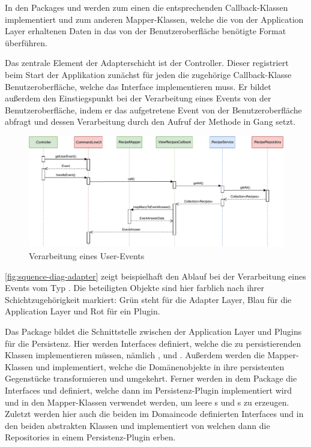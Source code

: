 In den Packages  und  werden zum einen die entsprechenden Callback-Klassen implementiert und zum anderen Mapper-Klassen, welche die von der Application Layer erhaltenen Daten in das von der Benutzeroberfläche benötigte Format überführen.

Das zentrale Element der Adapterschicht ist der Controller. Dieser registriert beim Start der Applikation zunächst für jeden  die zugehörige Callback-Klasse Benutzeroberfläche, welche das Interface  implementieren muss. Er bildet außerdem den Einstiegspunkt bei der Verarbeitung eines Events von der Benutzeroberfläche, indem er das aufgetretene Event von der Benutzeroberfläche abfragt und dessen Verarbeitung durch den Aufruf der Methode  in Gang setzt. 

\begin{figure}[ht!]
    \includegraphics[width=0.98\columnwidth]{../diagrams/adapter_sequence.pdf}
    \caption{Verarbeitung eines User-Events}
    \label{fig:squence-diag-adapter}
\end{figure}

\autoref{fig:squence-diag-adapter} zeigt beispielhaft den Ablauf bei der Verarbeitung eines Events vom Typ . Die beteiligten Objekte sind hier farblich nach ihrer Schichtzugehörigkeit markiert: Grün steht für die Adapter Layer, Blau für die Application Layer und Rot für ein Plugin.

Das Package  bildet die Schnittstelle zwischen der Application Layer und Plugins für die Persistenz. Hier werden Interfaces definiert, welche die zu persistierenden Klassen implementieren müssen, nämlich ,  und . Außerdem werden die Mapper-Klassen  und  implementiert, welche die Domänenobjekte in ihre persistenten Gegenstücke transformieren und umgekehrt. Ferner werden in dem Package die Interfaces  und  definiert, welche dann im Persistenz-Plugin implementiert wird und in den Mapper-Klassen verwendet werden, um leere s und s zu erzeugen. Zuletzt werden hier auch die beiden im Domaincode definierten Interfaces  und  in den beiden abstrakten Klassen  und  implementiert von welchen dann die Repositories in einem Persistenz-Plugin erben.

